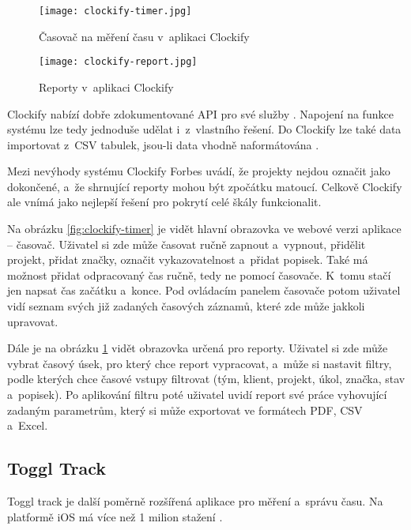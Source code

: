 \begin{figure}[p]
	\centering
	\texttt{[image: clockify-timer.jpg]}
	\caption{Časovač na měření času v~aplikaci Clockify \cite{clockify-features}}
	\label{fig:clockify-timer}
	\vspace{1cm}
	\texttt{[image: clockify-report.jpg]}
	\caption{Reporty v~aplikaci Clockify \cite{clockify-features}}
	\label{fig:clockify-report}
\end{figure}

Clockify nabízí dobře zdokumentované API pro své služby \cite{clockify-api}. Napojení na funkce systému lze tedy jednoduše udělat i~z~vlastního řešení. Do Clockify lze také data importovat z~CSV tabulek, jsou-li data vhodně naformátována \cite{clockify-import-timesheets}.

Mezi nevýhody systému Clockify Forbes uvádí, že projekty nejdou označit jako dokončené, a~že shrnující reporty mohou být zpočátku matoucí. Celkově Clockify ale vnímá jako nejlepší řešení pro pokrytí celé škály funkcionalit.

Na obrázku \ref{fig:clockify-timer} je vidět hlavní obrazovka ve webové verzi aplikace – časovač. Uživatel si zde může časovat ručně zapnout a~vypnout, přidělit projekt, přidat značky, označit vykazovatelnost a~přidat popisek. Také má možnost přidat odpracovaný čas ručně, tedy ne pomocí časovače. K~tomu stačí jen napsat čas začátku a~konce. Pod ovládacím panelem časovače potom uživatel vidí seznam svých již zadaných časových záznamů, které zde může jakkoli upravovat.

Dále je na obrázku \ref{fig:clockify-report} vidět obrazovka určená pro reporty. Uživatel si zde může vybrat časový úsek, pro který chce report vypracovat, a~může si nastavit filtry, podle kterých chce časové vstupy filtrovat (tým, klient, projekt, úkol, značka, stav a~popisek). Po aplikování filtru poté uživatel uvidí report své práce vyhovující zadaným parametrům, který si může exportovat ve formátech PDF, CSV a~Excel.

\subsection{Toggl Track}

Toggl track je další poměrně rozšířená aplikace pro měření a~správu času. Na platformě iOS má více než 1 milion stažení \cite{toggl-track-app-magic}. 


